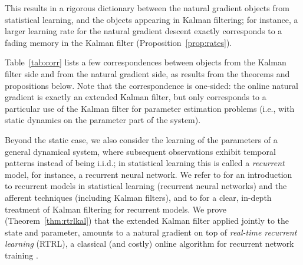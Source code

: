 \documentclass[11pt,a4paper]{article}
\newcommand{\1}{\mathbbm{1}}
\theoremstyle{yannthm}
\theoremstyle{yannthm2}
\numberwithin{equation}{section}
\begin{document}
This results in a rigorous dictionary between the natural gradient objects
from statistical learning, and the objects appearing in Kalman filtering;
for instance, a larger learning rate for the natural gradient descent
exactly corresponds to a fading memory in the Kalman filter
(Proposition~\ref{prop:rates}).

Table~\ref{tab:corr} lists a few correspondences between objects from
the Kalman filter side and from the natural gradient side, as results
from the theorems and propositions below. Note that the correspondence is
one-sided: the online natural gradient is exactly an extended Kalman filter, but
only corresponds to a particular use of the Kalman filter for parameter
estimation problems (i.e., with static dynamics on the parameter part of the
system).

Beyond the static case, we also consider the learning of the parameters
of a general dynamical system, where subsequent observations exhibit
temporal patterns instead of being i.i.d.; in statistical learning this is called a
\emph{recurrent} model, for instance, a recurrent neural network.  We
refer to \cite{Jaeger_tutorial} for an introduction to recurrent models
in statistical learning (recurrent neural networks) and the afferent
techniques (including Kalman filters), and to \cite{Haykin_book} for a
clear, in-depth treatment of Kalman filtering for recurrent models.  We
prove (Theorem~\ref{thm:rtrlkal}) that the extended Kalman filter applied
jointly to the state and parameter, amounts to a natural gradient
on top of \emph{real-time recurrent learning} (RTRL), a classical (and
costly) online algorithm for recurrent network training
\cite{Jaeger_tutorial}.
\end{document}
